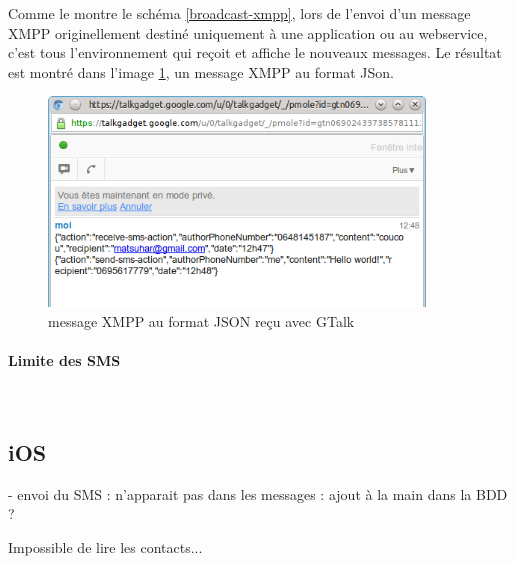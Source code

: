 Comme le montre le schéma \ref{broadcast-xmpp}, lors de l'envoi d'un message XMPP originellement destiné uniquement
à une application ou au webservice, c'est tous l'environnement qui reçoit et affiche le nouveaux messages.
Le résultat est montré dans l'image \ref{message-xmpp-json-gmail}, un message XMPP au format JSon. 
	
\begin{figure}[!h]
	\center
	\includegraphics[width=10cm]{img/message-xmpp-json-gmail.png}
	\caption{message XMPP au format JSON reçu avec GTalk}
	\label{message-xmpp-json-gmail}
\end{figure}

\paragraph{Limite des SMS}
~~\\




\subsection{iOS}

- envoi du SMS : n'apparait pas dans les messages : ajout à la main dans la BDD ?



Impossible de lire les contacts...
\\
